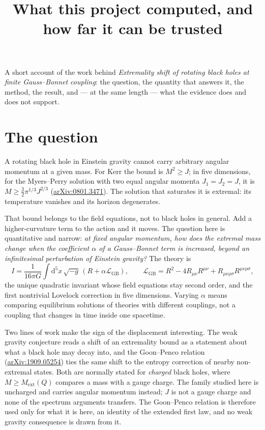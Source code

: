 \documentclass[10pt,a4paper]{article}
\title{\vspace{-1.2cm}What this project computed, and how far it can be trusted}
\author{}
\date{}
\newcommand{\GB}{\mathrm{GB}}
\newcommand{\ext}{\mathrm{ext}}
\newcommand{\dd}{\mathrm{d}}
\newcommand{\aX}[1]{\href{https://arxiv.org/abs/#1}{arXiv:#1}}
\begin{document}
\maketitle
\vspace{-1.8cm}

\noindent
A short account of the work behind \emph{Extremality shift of rotating black
holes at finite Gauss--Bonnet coupling}: the question, the quantity that answers
it, the method, the result, and --- at the same length --- what the evidence
does and does not support.

\section*{The question}

A rotating black hole in Einstein gravity cannot carry arbitrary angular
momentum at a given mass. For Kerr the bound is $M^2\ge J$; in five dimensions,
for the Myers--Perry solution with two equal angular momenta $J_1=J_2=J$, it is
$M\ge\tfrac32\pi^{1/3}J^{2/3}$ (\aX{0801.3471}). The solution that saturates it
is extremal: its temperature vanishes and its horizon degenerates.

That bound belongs to the field equations, not to black holes in general. Add a
higher-curvature term to the action and it moves. The question here is
quantitative and narrow: \emph{at fixed angular momentum, how does the extremal
mass change when the coefficient $\alpha$ of a Gauss--Bonnet term is increased,
beyond an infinitesimal perturbation of Einstein gravity?} The theory is
\begin{equation}
 I=\frac1{16\pi G}\int\dd^5x\,\sqrt{-g}\,(R+\alpha\mathcal L_\GB),
 \qquad
 \mathcal L_\GB=R^2-4R_{\mu\nu}R^{\mu\nu}+R_{\mu\nu\rho\sigma}R^{\mu\nu\rho\sigma},
 \label{eq:action}
\end{equation}
the unique quadratic invariant whose field equations stay second order, and the
first nontrivial Lovelock correction in five dimensions. Varying $\alpha$ means
comparing equilibrium solutions of theories with different couplings, not a
coupling that changes in time inside one spacetime.

Two lines of work make the sign of the displacement interesting. The weak
gravity conjecture reads a shift of an extremality bound as a statement about
what a black hole may decay into, and the Goon--Penco relation
(\aX{1909.05254}) ties the same shift to the entropy correction of nearby
non-extremal states. Both are normally stated for \emph{charged} black holes,
where $M\ge M_\ext(Q)$ compares a mass with a gauge charge. The family studied
here is uncharged and carries angular momentum instead; $J$ is not a gauge
charge and none of the spectrum arguments transfers. The Goon--Penco relation
is therefore used only for what it is here, an identity of the extended first
law, and no weak gravity consequence is drawn from it.
\end{document}

